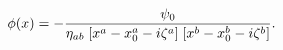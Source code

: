 \begin{equation}
\phi(x) = - 
{\psi_0
\over
\eta_{ab} \;[x^a-x_0^a-i\zeta^a] \; [x^b-x_0^b-i \zeta^b]
}.
\end{equation}

